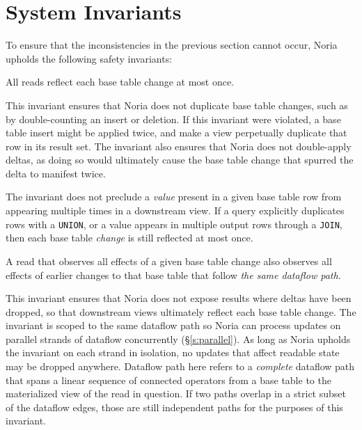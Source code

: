 \section{System Invariants}
\label{s:invariants}

To ensure that the inconsistencies in the previous section cannot occur, Noria
upholds the following safety invariants:

\begin{invariant}
  \label{i:no-spurious}
  All reads reflect each base table change at most once.
\end{invariant}

This invariant ensures that Noria does not duplicate base table changes, such as
by double-counting an insert or deletion. If this invariant were violated, a
base table insert might be applied twice, and make a view perpetually duplicate
that row in its result set. The invariant also ensures that Noria does not
double-apply deltas, as doing so would ultimately cause the base table change
that spurred the delta to manifest twice.

The invariant does not preclude a \emph{value} present in a given base table row
from appearing multiple times in a downstream view. If a query explicitly
duplicates rows with a \texttt{UNION}, or a value appears in multiple output
rows through a \texttt{JOIN}, then each base table \emph{change} is still
reflected at most once.


\begin{invariant}
  \label{i:no-holes}
  A read that observes all effects of a given base table change also observes
  all effects of earlier changes to that base table that follow \emph{the same
  dataflow path}.
\end{invariant}

This invariant ensures that Noria does not expose results where deltas have been
dropped, so that downstream views ultimately reflect each base table change. The
invariant is scoped to the same dataflow path so Noria can process updates on
parallel strands of dataflow concurrently (\S\ref{s:parallel}). As long as Noria
upholds the invariant on each strand in isolation, no updates that affect
readable state may be dropped anywhere. Dataflow path here refers to
a \emph{complete} dataflow path that spans a linear sequence of connected
operators from a base table to the materialized view of the read in question. If
two paths overlap in a strict subset of the dataflow edges, those are still
independent paths for the purposes of this invariant.

